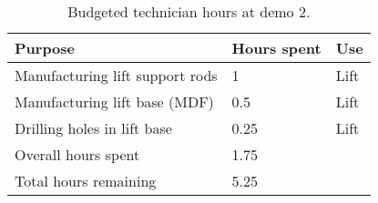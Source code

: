 \documentclass{article}
\begin{document}
\begin{table*}[h]
\vskip 3mm
\begin{center}
\begin{small}
\begin{sc}
  \begin{tabular}{lll}
    {\bf Purpose} & {\bf Hours spent} & {\bf Use} \\
    \hline
    Manufacturing lift support rods & 1 & Lift \\
    Manufacturing lift base (MDF) & 0.5 & Lift \\
    Drilling holes in lift base & 0.25 & Lift \\
    \hline
    \hline
    Overall hours spent & 1.75 & \\
    Total hours remaining & 5.25
  \end{tabular}
\end{sc}
\end{small}
\caption{Budgeted technician hours at demo 2.}
\label{tab:budget-cost-non-monetary}
\end{center}
\vskip -3mm
\end{table*}
\end{document}
